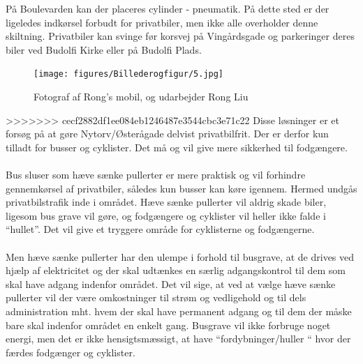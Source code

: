 På Boulevarden kan der placeres cylinder - pneumatik. På dette sted er der ligeledes indkørsel forbudt for privatbiler, men ikke alle overholder denne skiltning. Privatbiler kan svinge før korsvej på Vingårdsgade og parkeringer deres biler ved Budolfi Kirke eller på Budolfi Plads.
\begin{figure}[htbp]
  \centering
  \begin{adjustbox}{max width=\textwidth}
    \texttt{[image: figures/Billederogfigur/5.jpg]}
 \end{adjustbox}
  \caption{ Fotograf af Rong’s mobil, og udarbejder Rong Liu}
   \label{fig: Fotograf af Rong}
\end{figure}
>>>>>>> cecf2882df1ee084eb1246487e3544cbc3e71c22
Disse løsninger er et forsøg på at gøre Nytorv/Østerågade delvist privatbilfrit. Der er derfor kun tilladt for busser og cyklister. Det må og vil give mere sikkerhed til fodgængere.
~\\\\
Bus sluser som hæve sænke pullerter er mere praktisk og vil forhindre gennemkørsel af privatbiler, således kun busser kan køre igennem. Hermed undgås privatbilstrafik inde i området. Hæve sænke pullerter vil aldrig skade biler, ligesom bus grave vil gøre, og fodgængere og cyklister vil heller ikke falde i “hullet”. Det vil give et tryggere område for cyklisterne og fodgængerne.
~\\\\
Men hæve sænke pullerter har den ulempe i forhold til busgrave, at de drives ved hjælp af elektricitet og der skal udtænkes en særlig adgangskontrol til dem som skal have adgang indenfor området. Det vil sige, at ved at vælge hæve sænke pullerter vil der være omkostninger til strøm og vedligehold og til dels administration mht. hvem der skal have permanent adgang og til dem der måske bare skal indenfor området en enkelt gang. Busgrave vil ikke forbruge noget energi, men det er ikke hensigtsmæssigt, at have “fordybninger/huller “ hvor der færdes fodgænger og cyklister.
